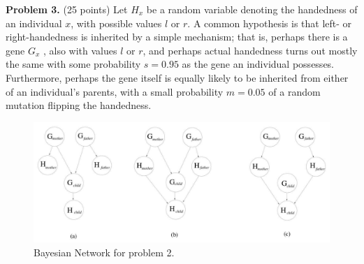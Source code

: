 \documentclass{article}
\begin{document}
\textbf{Problem 3.} (25 points) Let $H_x$ be a random variable
denoting the handedness of an individual $x$, with possible values $l$
or $r$. A common hypothesis is that left- or right-handedness is
inherited by a simple mechanism; that is, perhaps there is a gene
$G_x$ , also with values $l$ or $r$, and perhaps actual handedness
turns out mostly the same with some probability $s = 0.95$ as the gene
an individual possesses. Furthermore, perhaps the gene itself is
equally likely to be inherited from either of an individual’s parents,
with a small probability $m = 0.05$ of a random mutation flipping the
handedness.
\begin{figure}[ht]
  \centering
  \includegraphics[width=\textwidth]{AI-FINAL-3_1.pdf}
  \caption{Bayesian Network for problem 2.}\label{fig:final_3.1}
\end{figure}
\end{document}
